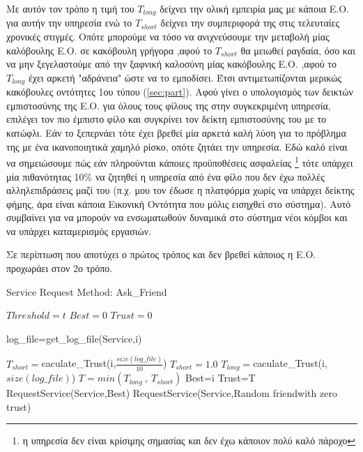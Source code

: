 Με αυτόν τον τρόπο η τιμή του  $T_{long}$ δείχνει την ολική εμπειρία μας με κάποια Ε.Ο. για αυτήν την υπηρεσία ενώ το $T_{short}$ δείχνει την συμπεριφορά της στις τελευταίες χρονικές στιγμές. Οπότε μπορούμε να τόσο να ανιχνεύσουμε την μεταβολή μίας καλόβουλης Ε.Ο. σε κακόβουλη γρήγορα ,αφού το $T_{short}$ θα μειωθεί ραγδαία, όσο και να μην ξεγελαστούμε από την ξαφνική καλοσύνη μίας κακόβουλης Ε.Ο. ,αφού το $T_{long}$  έχει αρκετή "αδράνεια" ώστε να το εμποδίσει. Έτσι αντιμετωπίζονται μερικώς κακόβουλες οντότητες 1ου τύπου (\ref{sec:part}).
\newpage
Αφού γίνει ο υπολογισμός των δεικτών εμπιστοσύνης της Ε.Ο. για όλους τους φίλους της στην συγκεκριμένη υπηρεσία, επιλέγει τον πιο έμπιστο φίλο και συγκρίνει τον δείκτη εμπιστοσύνης του με το κατώφλι. Εάν το ξεπερνάει τότε έχει βρεθεί μία αρκετά καλή λύση για το πρόβλημα της με ένα ικανοποιητικά χαμηλό ρίσκο, οπότε ζητάει την υπηρεσία. Εδώ καλό είναι να σημειώσουμε πώς εάν πληρούνται κάποιες προϋποθέσεις ασφαλείας \footnote{η υπηρεσία δεν είναι κρίσιμης σημασίας και δεν έχω κάποιον πολύ καλό πάροχο} τότε υπάρχει μία πιθανότητας 10\% να ζητηθεί η υπηρεσία από ένα φίλο που δεν έχω πολλές αλληλεπιδράσεις μαζί του (π.χ. μου τον έδωσε η πλατφόρμα χωρίς να υπάρχει δείκτης φήμης, άρα είναι κάποια Εικονική Οντότητα που μόλις εισηχθεί στο σύστημα). Αυτό συμβαίνει για να μπορούν να ενσωματωθούν δυναμικά στο σύστημα νέοι κόμβοι και να υπάρχει καταμερισμός εργασιών. 

Σε περίπτωση που αποτύχει ο πρώτος τρόπος και δεν βρεθεί κάποιος η Ε.Ο. προχωράει στον 2ο τρόπο. 

\begin{algorithm}
\caption{Service Request Method: Ask\_Friend}
\label{Service Request 1}
\begin{algorithmic}[1]
\State $Threshold = t$
\State $Best = 0$
\State $Trust = 0$


\State log\_file=get\_log\_file(Service,i)

\State $T_{short}=$caculate\_Trust(i,$\frac{size \left(log\_file\right)}{10}$)
   \Else \State $T_{short}=1.0$
   \EndIf
\State $T_{long}=$caculate\_Trust(i,$size \left(log\_file\right)$)
\State $ T = min(T_{long} \  , \  T_{short})$
	\State Best=i
	\State Trust=T
\EndIf
\EndFor
{}
	\State RequestService(Service,Best)
	\Else 
			\State RequestService(Service,Random friendwith zero trust)
	\EndIf
\EndIf

\EndProcedure
\end{algorithmic}
\end{algorithm}
\newpage
